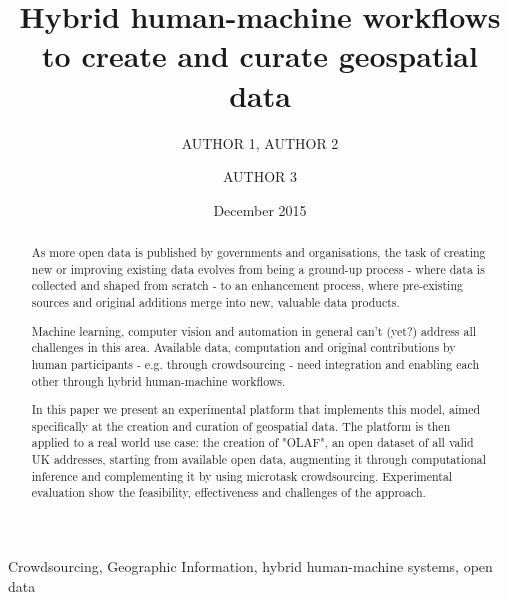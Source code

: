 \documentclass{llncs}
\title{Hybrid human-machine workflows to create and curate geospatial data}
\author{AUTHOR 1\inst{1}, AUTHOR 2\inst{1} \and AUTHOR 3\inst{2}}
\institute{INSTITUTE 1 \email{EMAIL FOR AUTHOR 1} \and INSTITUTE 2}
\date{December 2015}
\begin{document}
\maketitle

\begin{abstract}
As more open data is published by governments and organisations, the task of creating new or improving existing data evolves from being a ground-up process - where data is collected and shaped from scratch - to an enhancement process, where pre-existing sources and original additions merge into new, valuable data products. 

Machine learning, computer vision and automation in general can't (yet?) address all challenges in this area. Available data, computation and original contributions by human participants - e.g. through crowdsourcing - need integration and enabling each other through hybrid human-machine workflows. 

In this paper we present an experimental platform that implements this model, aimed specifically at the creation and curation of geospatial data. The platform is then applied to a real world use case: the creation of "OLAF", an open dataset of all valid UK addresses, starting from available open data, augmenting it through computational inference and complementing it by using microtask crowdsourcing. Experimental evaluation show the feasibility, effectiveness and challenges of the approach.
\end{abstract}

\begin{keywords}
Crowdsourcing, Geographic Information, hybrid human-machine systems, open data 
\end{keywords}
\end{document}
